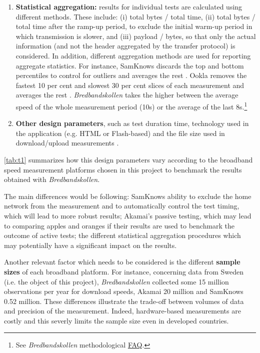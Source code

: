 \documentclass[12pt]{article}
\begin{document}
\begin{enumerate}[label=\textbf{\arabic* --}]
	\item \textbf{Statistical aggregation:} results for individual tests are calculated using different methods. These include: (i) total bytes / total time, (ii) total bytes / total time after the ramp-up period, to exclude the initial warm-up period in which transmission is slower, and (iii) payload / bytes, so that only the actual information (and not the header aggregated by the transfer protocol) is considered. In addition, different aggregation methods are used for reporting aggregate statistics. For instance, SamKnows discards the top and bottom percentiles to control for outliers and averages the rest \citep{samknows2013}. Ookla removes the fastest 10 per cent and slowest 30 per cent slices of each measurement and averages the rest \citep{bauer2010}. \textit{Bredbandskollen} takes the higher between the average speed of the whole measurement period (10s) or the average of the last 8s.\footnote{See \textit{Bredbandskollen} methodological \href{https://ensupport.bredbandskollen.se/support/solutions/articles/1000228167-how-does-the-measurement-work-in-technical-terms-}{FAQ}.}   
	
	\item \textbf{Other design parameters}, such as test duration time, technology used in the application (e.g. HTML or Flash-based) and the file size used in download/upload measurements \citep{bauer2010,zuhyle2015}.             

\end{enumerate} 

\autoref{tab:t1} summarizes how this design parameters vary according to the broadband speed measurement platforms chosen in this project to benchmark the results obtained with \textit{Bredbandskollen}.

The main differences would be following: SamKnows ability to exclude the home network from the measurement and to automatically control the test timing, which will lead to more robust results; Akamai's passive testing, which may lead to comparing apples and oranges if their results are used to benchmark the outcome of active tests; the different statistical aggregation procedures which may potentially have a significant impact on the results.

Another relevant factor which needs to be considered is the different \textbf{sample sizes} of each broadband platform. For instance, concerning data from Sweden (i.e. the object of this project), \textit{Bredbandskollen} collected some 15 million observations per year for download speeds, Akamai 20 million and SamKnows 0.52 million. These differences illustrate the trade-off between volumes of data and precision of the measurement. Indeed, hardware-based measurements are costly and this severly limits the sample size even in developed countries.
\vspace{1cm}      
 
\end{document}
